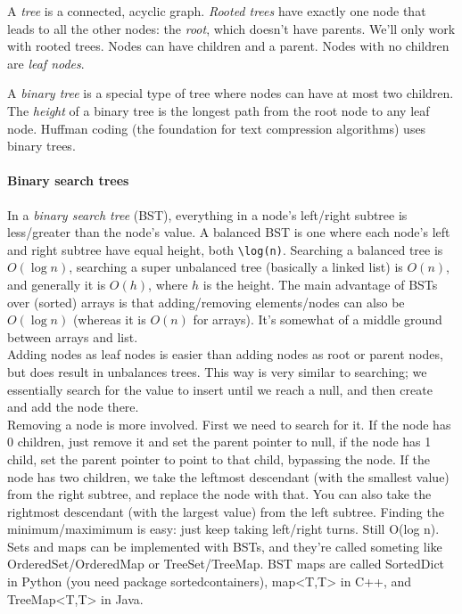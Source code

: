 \documentclass[8pt, table, xcdraw]{article}%
\begin{document}
A \emph{tree} is a connected, acyclic graph. \emph{Rooted trees} have exactly one node that leads to all the other nodes: the \emph{root}, which doesn't have parents. We'll only work with rooted trees. Nodes can have children and a parent. Nodes with no children are \emph{leaf nodes}.

A \emph{binary tree} is a special type of tree where nodes can have at most two children. The \emph{height} of a binary tree is the longest path from the root node to any leaf node. Huffman coding (the foundation for text compression algorithms) uses binary trees.

\paragraph{Binary search trees}

In a \emph{binary search tree} (BST), everything in a node's left/right subtree is less/greater than the node's value. A balanced BST is one where each node's left and right subtree have equal height, both \lstinline{\log(n)}. Searching a balanced tree is $O(\log n)$, searching a super unbalanced tree (basically a linked list) is $O(n)$, and generally it is $O(h)$, where $h$ is the height. The main advantage of BSTs over (sorted) arrays is that adding/removing elements/nodes can also be $O(\log n)$ (whereas it is $O(n)$ for arrays). It's somewhat of a middle ground between arrays and list.\\
Adding nodes as leaf nodes is easier than adding nodes as root or parent nodes, but does result in unbalances trees. This way is very similar to searching; we essentially search for the value to insert until we reach a null, and then create and add the node there.\\
Removing a node is more involved. First we need to search for it. If the node has 0 children, just remove it and set the parent pointer to null, if the node has 1 child, set the parent pointer to point to that child, bypassing the node. If the node has two children, we take the leftmost descendant (with the smallest value) from the right subtree, and replace the node with that. You can also take the rightmost descendant (with the largest value) from the left subtree. Finding the minimum/maximimum is easy: just keep taking left/right turns. Still O(log n).
Sets and maps can be implemented with BSTs, and they're called someting like OrderedSet/OrderedMap or TreeSet/TreeMap. BST maps are called SortedDict in Python (you need package sortedcontainers), map<T,T> in C++, and TreeMap<T,T> in Java.
\end{document}
